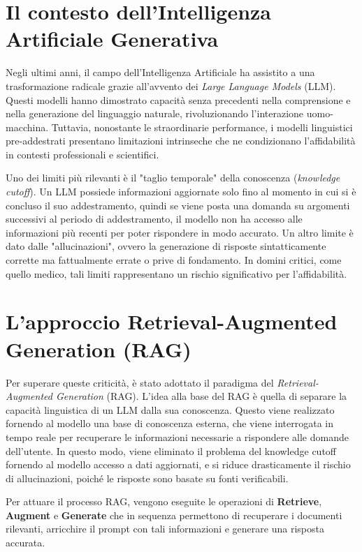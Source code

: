 \newpage\pagestyle{introduction}


\section*{Il contesto dell'Intelligenza Artificiale Generativa}

Negli ultimi anni, il campo dell'Intelligenza Artificiale ha assistito a una trasformazione radicale grazie all'avvento dei \textit{Large Language Models} (LLM). Questi modelli hanno dimostrato capacità senza precedenti nella comprensione e nella generazione del linguaggio naturale, rivoluzionando l'interazione uomo-macchina. Tuttavia, nonostante le straordinarie performance, i modelli linguistici pre-addestrati presentano limitazioni intrinseche che ne condizionano l'affidabilità in contesti professionali e scientifici.

Uno dei limiti più rilevanti è il "taglio temporale" della conoscenza (\textit{knowledge cutoff}). Un LLM possiede informazioni aggiornate solo fino al momento in cui si è concluso il suo addestramento, quindi se viene posta una domanda su argomenti successivi al periodo di addestramento, il modello non ha accesso alle informazioni più recenti per poter rispondere in modo accurato. Un altro limite è dato dalle "allucinazioni", ovvero la generazione di risposte sintatticamente corrette ma fattualmente errate o prive di fondamento. In domini critici, come quello medico, tali limiti rappresentano un rischio significativo per l'affidabilità.

\section*{L'approccio Retrieval-Augmented Generation (RAG)}

Per superare queste criticità, è stato adottato il paradigma del \textit{Retrieval-Augmented Generation} (RAG). L'idea alla base del RAG è quella di separare la capacità linguistica di un LLM dalla sua conoscenza. Questo viene realizzato fornendo al modello una base di conoscenza esterna, che viene interrogata in tempo reale per recuperare le informazioni necessarie a rispondere alle domande dell'utente. In questo modo, viene eliminato il problema del knowledge cutoff fornendo al modello accesso a dati aggiornati, e si riduce drasticamente il rischio di allucinazioni, poiché le risposte sono basate su fonti verificabili.

Per attuare il processo RAG, vengono eseguite le operazioni di \textbf{Retrieve}, \textbf{Augment} e \textbf{Generate} che in sequenza permettono di recuperare i documenti rilevanti, arricchire il prompt con tali informazioni e generare una risposta accurata.

